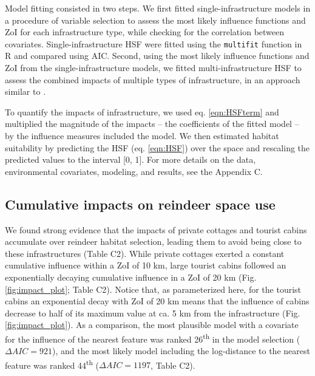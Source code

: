 \documentclass[titlepage]{article}
\begin{document}
Model fitting consisted in two steps. We first fitted single-infrastructure models in a procedure of variable selection \citep{burnham_model_2002} to assess the most likely influence functions and ZoI for each infrastructure type, while checking for the correlation between covariates. Single-infrastructure HSF were fitted using the \verb|multifit| function in R \citep{huais_multifit_2018} and compared using AIC. Second, using the most likely influence functions and ZoI from the single-infrastructure models, we fitted multi-infrastructure HSF to assess the combined impacts of multiple types of infrastructure, in an approach similar to \citet{laforge_process-focussed_2015}. 

To quantify the impacts of infrastructure, we used eq. \ref{eqn:HSFterm} and multiplied the magnitude of the impacts -- the coefficients of the fitted model -- by the influence measures included the model. We then estimated habitat suitability by predicting the HSF (eq. \ref{eqn:HSF}) over the space and rescaling the predicted values to the interval [0, 1]. For more details on the data, environmental covariates, modeling, and results, see the Appendix C.

\subsection{Cumulative impacts on reindeer space use}

We found strong evidence that the impacts of private cottages and tourist cabins accumulate over reindeer habitat selection, leading them to avoid being close to these infrastructures (Table C2). While private cottages exerted a constant cumulative influence within a ZoI of 10 km, large tourist cabins followed an exponentially decaying cumulative influence in a ZoI of 20 km (Fig. \ref{fig:impact_plot}; Table C2). Notice that, as parameterized here, for the tourist cabins an exponential decay with ZoI of 20 km means
that the influence of cabins decrease to half of its maximum value
at ca. 5 km from the infrastructure (Fig. \ref{fig:impact_plot}). As a comparison, the most plausible model with a covariate for the influence of the nearest feature was ranked 26\textsuperscript{th} in the model selection ($\Delta AIC = 921$), and the most likely model including the log-distance to the nearest feature was ranked 44\textsuperscript{th} ($\Delta AIC = 1197$, Table C2).
\end{document}
